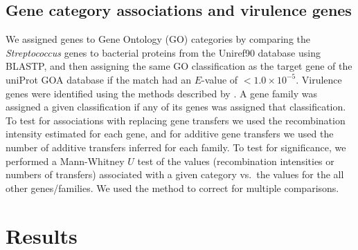 \documentclass[12pt]{article}
\begin{document}

\subsection*{Gene category associations and virulence genes}

We assigned genes to Gene Ontology (GO) categories by comparing the {\em
  Streptococcus} genes to bacterial proteins from the Uniref90 database
using BLASTP, and then assigning the same GO classification as the target
gene of the uniProt GOA database if the match had an $E$-value of
$<1.0\times10^{-5}.$  Virulence genes were identified using the methods
described by \cite{Suzuki2011}. A gene family was assigned a given
classification if any of its genes was assigned that classification.  To
test for associations with replacing gene transfers we used the
recombination intensity estimated for each gene, and for additive gene
transfers we used the number of additive transfers inferred for each
family.  To test for significance, we performed a Mann-Whitney $U$ test of
the values (recombination intensities or numbers of transfers) associated
with a given category vs.\ the values for the all other genes/families.  We
used the \cite{Benjamini1995} method to correct for multiple comparisons.

\section*{Results}
\end{document}
